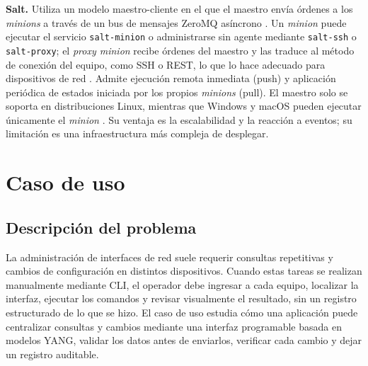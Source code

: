\textbf{Salt.} Utiliza un modelo maestro-cliente en el que el maestro envía órdenes a los \textit{minions} a través de un bus de mensajes ZeroMQ asíncrono \parencite{salt_arch}. Un \textit{minion} puede ejecutar el servicio \texttt{salt-minion} o administrarse sin agente mediante \texttt{salt-ssh} o \texttt{salt-proxy}; el \textit{proxy minion} recibe órdenes del maestro y las traduce al método de conexión del equipo, como SSH o REST, lo que lo hace adecuado para dispositivos de red \parencite{salt}. Admite ejecución remota inmediata (push) y aplicación periódica de estados iniciada por los propios \textit{minions} (pull). El maestro solo se soporta en distribuciones Linux, mientras que Windows y macOS pueden ejecutar únicamente el \textit{minion} \parencite{salt_os}. Su ventaja es la escalabilidad y la reacción a eventos; su limitación es una infraestructura más compleja de desplegar.

\section{Caso de uso}

\subsection{Descripción del problema}
La administración de interfaces de red suele requerir consultas repetitivas y cambios de configuración en distintos dispositivos. Cuando estas tareas se realizan manualmente mediante CLI, el operador debe ingresar a cada equipo, localizar la interfaz, ejecutar los comandos y revisar visualmente el resultado, sin un registro estructurado de lo que se hizo. El caso de uso estudia cómo una aplicación puede centralizar consultas y cambios mediante una interfaz programable basada en modelos YANG, validar los datos antes de enviarlos, verificar cada cambio y dejar un registro auditable.

